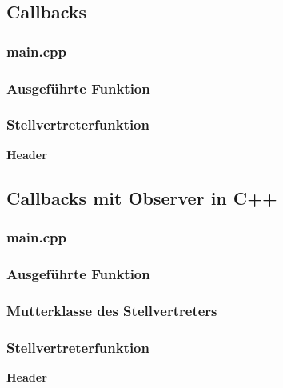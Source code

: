 \subsection{Callbacks}

\begin{minipage}[t]{0.48\textwidth}
\subsubsection{main.cpp}

\subsubsection{Ausgeführte Funktion}

\end{minipage}\hfill
\begin{minipage}[t]{0.48\textwidth}
\subsubsection{Stellvertreterfunktion}

\textbf{Header}

\end{minipage}

\subsection{Callbacks mit Observer in C++}
\begin{minipage}[t]{0.48\textwidth}
\subsubsection{main.cpp}

\subsubsection{Ausgeführte Funktion}

\subsubsection{Mutterklasse des Stellvertreters}

\end{minipage}\hfill
\begin{minipage}[t]{0.48\textwidth}
\subsubsection{Stellvertreterfunktion}

\textbf{Header}

\end{minipage}


